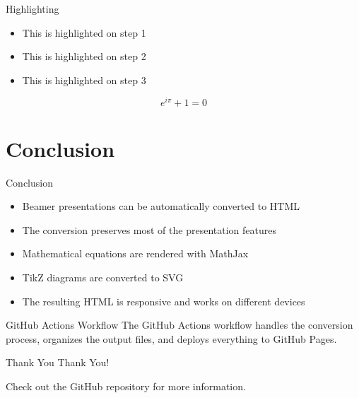 \documentclass{beamer}
\begin{document}
\begin{frame}{Highlighting}
  \begin{itemize}
    \item<1-| alert@1> This is highlighted on step 1
    \item<2-| alert@2> This is highlighted on step 2
    \item<3-| alert@3> This is highlighted on step 3
  \end{itemize}
  
  \begin{equation}
    e^{i\pi} + 1 = 0
  \end{equation}
\end{frame}

\section{Conclusion}

\begin{frame}{Conclusion}
  \begin{itemize}
    \item Beamer presentations can be automatically converted to HTML
    \item The conversion preserves most of the presentation features
    \item Mathematical equations are rendered with MathJax
    \item TikZ diagrams are converted to SVG
    \item The resulting HTML is responsive and works on different devices
  \end{itemize}
  
  \begin{block}{GitHub Actions Workflow}
    The GitHub Actions workflow handles the conversion process, organizes the output files, and deploys everything to GitHub Pages.
  \end{block}
\end{frame}

\begin{frame}{Thank You}
  \centering
  \Huge Thank You!
  
  \vspace{1cm}
  
  \large
  Check out the GitHub repository for more information.
\end{frame}
\end{document}
